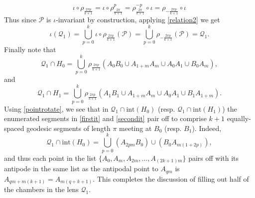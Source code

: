\documentclass[11pt, reqno]{amsart}
\numberwithin{equation}{section}
\begin{document}
\begin{equation}\label{relation2}
\iota\circ\rho_{\frac{2\pi p}{k+1}}=\iota\circ \rho^p_{\frac{2\pi}{k+1}}=\rho^{-p}_{\frac{2\pi }{k+1}}\circ\iota=\rho_{-\frac{2\pi p}{k+1}}\circ\iota \end{equation} 
Thus since $\mathcal{P}$ is $\iota$-invariant by construction, applying \eqref{relation2} we get
\begin{equation}
\iota(\mathcal{Q}_1)=\bigcup_{p=0}^{k}\iota\circ \rho_{\frac{2\pi p}{k+1}}(\mathcal{P})=\bigcup_{p=0}^{k}\rho_{-\frac{2\pi p}{k+1}}(\mathcal{P})=\mathcal{Q}_1.
\end{equation}
Finally note that
\begin{equation}\label{firstit}
\mathcal{Q}_1\cap H_0=\bigcup_{p=0}^k \rho_{\frac{2\pi p }{k+1}}(A_0B_0\cup A_{1+m}A_{m}\cup A_0A_1\cup B_0A_{m}), 
\end{equation}
and
\begin{equation}\label{secondit}
\mathcal{Q}_1\cap H_1=\bigcup_{p=0}^k \rho_{\frac{2\pi p }{k+1}}(A_1B_1\cup A_{1+m}A_{m}\cup A_0A_1\cup B_1A_{1+m}).  
\end{equation}
Using \eqref{pointrotate}, we see that in $\mathcal{Q}_1\cap\mbox{int}(H_0)$ (resp. $\mathcal{Q}_1\cap\mbox{int}(H_1)$) the enumerated segments in \eqref{firstit} and \eqref{secondit} pair off to comprise $k+1$ equally-spaced geodesic segments of length $\pi$ meeting at $B_0$ (resp. $B_1$).  Indeed, 
\begin{equation}\label{pairingoff}
\mathcal{Q}_1\cap\mbox{int}(H_0)=\bigcup_{p=0}^k (A_{2pm}B_0)\cup(B_0A_{m(1+2p)}), 
\end{equation}
and thus each point in the list $\{A_0,A_m,A_{2m},...,A_{(2k+1)m}\}$ pairs off with its antipode in the same list as the antipodal point to $A_{qm}$ is $A_{qm+m(k+1)}=A_{m(q+k+1)}$. This completes the discussion of filling out half of the chambers in the lens $\mathcal{Q}_1$. 
\end{document}

